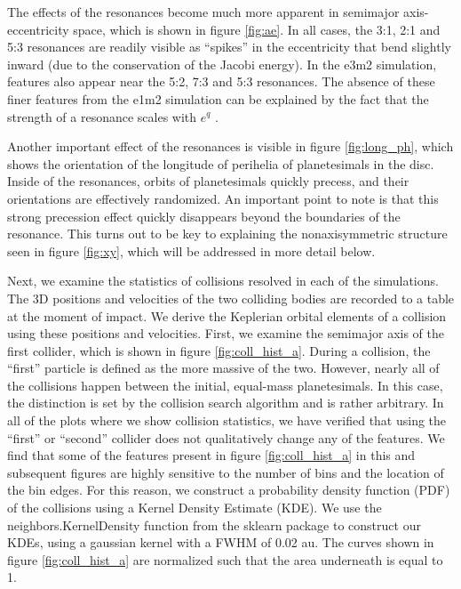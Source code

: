 \documentclass[fleqn,usenatbib]{mnras}
\begin{document}
The effects of the resonances become much more apparent in semimajor axis-eccentricity space, which is shown in figure \ref{fig:ae}. In all cases, 
the 3:1, 2:1 and 5:3 resonances are readily visible as ``spikes'' in the eccentricity that bend slightly inward (due to the conservation of the Jacobi energy). In the 
e3m2 simulation, features also appear near the 5:2, 7:3 and 5:3 resonances. The absence of these finer features from the e1m2 simulation can be 
explained by the fact that the strength of a resonance scales with $e^{q}$ \citep{1994PhyD...77..289M}.

Another important effect of the resonances is visible in figure \ref{fig:long_ph}, which shows the orientation of the longitude of perihelia of 
planetesimals in the disc. Inside of the resonances, orbits of planetesimals quickly precess, and their orientations are effectively randomized. An 
important point to note is that this strong precession effect quickly disappears beyond the boundaries of the resonance. This turns out to be 
key to explaining the nonaxisymmetric structure seen in figure \ref{fig:xy}, which will be addressed in more detail below.

Next, we examine the statistics of collisions resolved in each of the simulations. The 3D positions and velocities of the two colliding bodies are 
recorded to a table at the moment of impact. We derive the Keplerian orbital elements of a collision using these positions and velocities. 
First, we examine the semimajor axis of the first collider, which is shown in figure \ref{fig:coll_hist_a}. During a collision, the ``first'' particle is defined 
as the more massive of the two. However, nearly all of the collisions happen between the initial, equal-mass planetesimals. In this case, the 
distinction is set by the collision search algorithm and is rather arbitrary. In all of the plots where we show collision statistics, we have verified that 
using the ``first'' or ``second'' collider does not qualitatively change any of the features. We find that some of the features present in figure 
\ref{fig:coll_hist_a} in this and subsequent figures are highly sensitive to the number of bins and the location of the bin edges. For this reason, we 
construct a probability density function (PDF) of the collisions using a Kernel Density Estimate (KDE). We use the {\sc neighbors.KernelDensity} function from the {\sc sklearn} 
\citep{scikit-learn} package to construct our KDEs, using a gaussian kernel with a FWHM of 0.02 au. The curves shown in figure \ref{fig:coll_hist_a} are normalized such that the 
area underneath is equal to 1.
\end{document}
